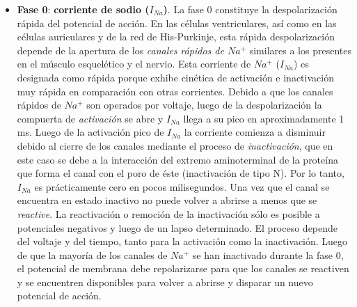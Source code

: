 \begin{itemize}
  \item \textbf{Fase 0}: \textbf{corriente de sodio ($I_{Na}$)}. La fase 0 constituye la despolarización rápida del potencial de acción. En las células ventriculares, así como en las células auriculares y de la red de His-Purkinje, esta rápida despolarización depende de la apertura de los \textit{canales rápidos de $Na^+$} similares a los presentes en el músculo esquelético y el nervio. Esta corriente de $Na^+$ ($I_{Na}$) es designada como rápida porque exhibe cinética de activación e inactivación muy rápida en comparación con otras corrientes. Debido a que los canales rápidos de $Na^+$ son operados por voltaje, luego de la despolarización la compuerta de \textit{activación} se abre y $I_{Na}$ llega a su pico en aproximadamente 1 ms. Luego de la activación pico de $I_{Na}$ la corriente comienza a disminuir debido al cierre de los canales mediante el proceso de \textit{inactivación}, que en este caso se debe a la interacción del extremo aminoterminal de la proteína que forma el canal con el poro de éste (inactivación de tipo N). Por lo tanto, $I_{Na}$ es prácticamente cero en pocos milisegundos. Una vez que el canal se encuentra en estado inactivo no puede volver a abrirse a menos que se \textit{reactive}. La reactivación o remoción de la inactivación sólo es posible a potenciales negativos y luego de un lapso determinado. El proceso depende del voltaje y del tiempo, tanto para la activación como la inactivación. Luego de que la mayoría de los canales de $Na^+$ se han inactivado durante la fase 0, el potencial de membrana debe repolarizarse para que los canales se reactiven y se encuentren disponibles para volver a abrirse y disparar un nuevo potencial de acción. \\

\end{itemize}
